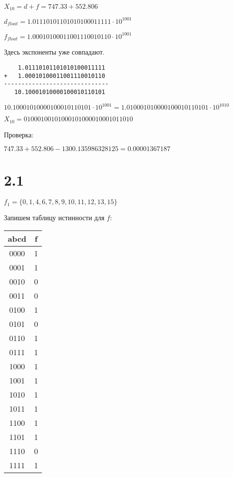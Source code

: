 \documentclass[a4paper,12pt]{article}
\begin{document}
$X_{10} = d + f = 747.33 + 552.806$

$d_{float} = 1.01110101101010100011111 \cdot 10^{1001}$

$f_{float} = 1.00010100011001110010110 \cdot 10^{1001}$

Здесь экспоненты уже совпадают.

\begin{verbatim}
    1.01110101101010100011111
+   1.00010100011001110010110
------------------------------
   10.10001010000100010110101
\end{verbatim}

$10.10001010000100010110101 \cdot 10^{1001} = 1.010001010000100010110101 \cdot 10^{1010}$

$X_{10} = 0 10001001 01000101000010001011010$

Проверка:

$747.33 + 552.806 - 1300.135986328125 = 0.00001367187$

\newpage



\section*{2.1}

$f_1 = \{0, 1, 4, 6, 7, 8, 9, 10, 11, 12, 13, 15\}$

Запишем таблицу истинности для $f$:

\begin{center}
	\begin{tabular}{| c | c |}
	\hline
	abcd & f \\
	\hline
	0000 & 1 \\
	0001 & 1 \\
	0010 & 0 \\
	0011 & 0 \\
	0100 & 1 \\
	0101 & 0 \\
	0110 & 1 \\
	0111 & 1 \\
	1000 & 1 \\
	1001 & 1 \\
	1010 & 1 \\
	1011 & 1 \\
	1100 & 1 \\
	1101 & 1 \\
	1110 & 0 \\
	1111 & 1 \\
	\hline
	\end{tabular}
\end{center}
\end{document}
